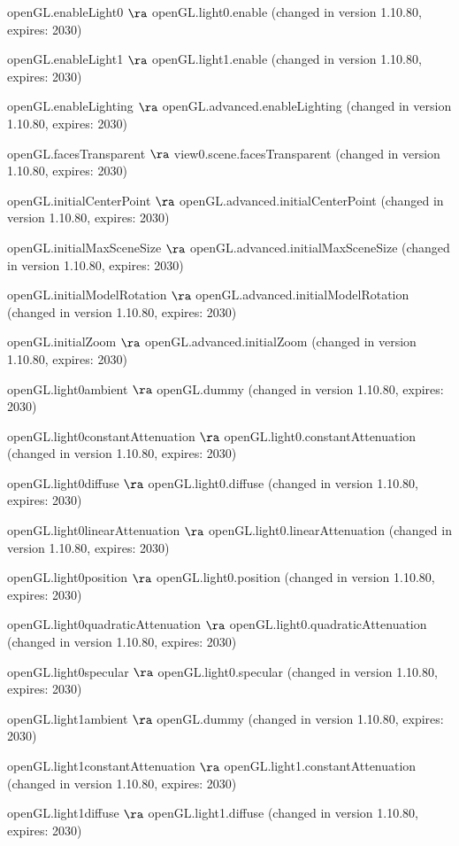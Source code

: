   \item openGL.enableLight0 $\ra$ openGL.light0.enable (changed in version 1.10.80, expires: 2030)
  \item openGL.enableLight1 $\ra$ openGL.light1.enable (changed in version 1.10.80, expires: 2030)
  \item openGL.enableLighting $\ra$ openGL.advanced.enableLighting (changed in version 1.10.80, expires: 2030)
  \item openGL.facesTransparent $\ra$ view0.scene.facesTransparent (changed in version 1.10.80, expires: 2030)
  \item openGL.initialCenterPoint $\ra$ openGL.advanced.initialCenterPoint (changed in version 1.10.80, expires: 2030)
  \item openGL.initialMaxSceneSize $\ra$ openGL.advanced.initialMaxSceneSize (changed in version 1.10.80, expires: 2030)
  \item openGL.initialModelRotation $\ra$ openGL.advanced.initialModelRotation (changed in version 1.10.80, expires: 2030)
  \item openGL.initialZoom $\ra$ openGL.advanced.initialZoom (changed in version 1.10.80, expires: 2030)
  \item openGL.light0ambient $\ra$ openGL.dummy (changed in version 1.10.80, expires: 2030)
  \item openGL.light0constantAttenuation $\ra$ openGL.light0.constantAttenuation (changed in version 1.10.80, expires: 2030)
  \item openGL.light0diffuse $\ra$ openGL.light0.diffuse (changed in version 1.10.80, expires: 2030)
  \item openGL.light0linearAttenuation $\ra$ openGL.light0.linearAttenuation (changed in version 1.10.80, expires: 2030)
  \item openGL.light0position $\ra$ openGL.light0.position (changed in version 1.10.80, expires: 2030)
  \item openGL.light0quadraticAttenuation $\ra$ openGL.light0.quadraticAttenuation (changed in version 1.10.80, expires: 2030)
  \item openGL.light0specular $\ra$ openGL.light0.specular (changed in version 1.10.80, expires: 2030)
  \item openGL.light1ambient $\ra$ openGL.dummy (changed in version 1.10.80, expires: 2030)
  \item openGL.light1constantAttenuation $\ra$ openGL.light1.constantAttenuation (changed in version 1.10.80, expires: 2030)
  \item openGL.light1diffuse $\ra$ openGL.light1.diffuse (changed in version 1.10.80, expires: 2030)
